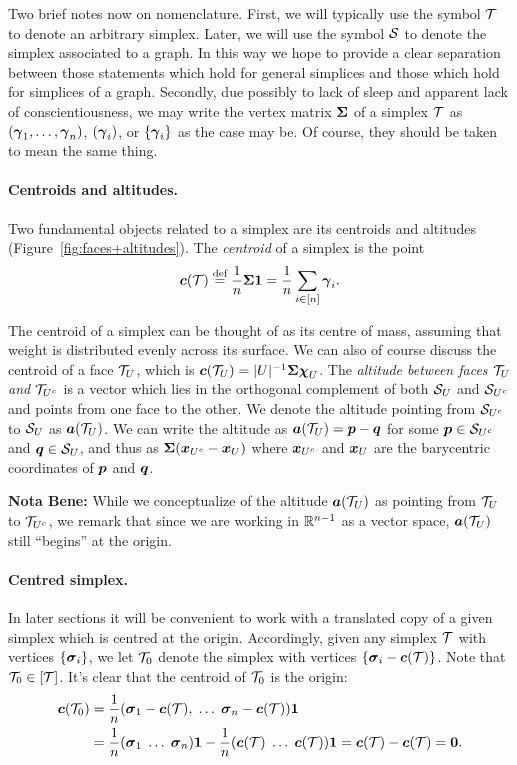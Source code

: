 Two brief notes now on nomenclature. First, we will typically  use the symbol $\mathcal{T}$ to denote an arbitrary simplex. Later, we will use the symbol $\mathcal{S}$  to denote  the simplex associated  to a  graph. In  this way we hope to provide a clear separation between those statements which hold for general simplices and those which hold for simplices of a graph. Secondly, due possibly  to lack of sleep and apparent lack  of conscientiousness, we may  write the vertex matrix  $\boldsymbol{\Sigma}$ of a simplex $\mathcal{T}$ as $(\vb*{\gamma}_1,\dots,\vb*{\gamma}_n)$, $(\vb*{\gamma}_i)$, or $\{\vb*{\gamma}_i\}$  as the case may be. Of course, they should be taken to mean  the  same  thing.  


\paragraph{Centroids and altitudes.}
Two fundamental objects related to a simplex are its centroids and altitudes (Figure~\ref{fig:faces+altitudes}). The \emph{centroid} of a simplex is the point 
\begin{equation}
\label{eq:centroid}
\vb*{c}(\mathcal{T}) \overset{\text{def}}{=} \frac{1}{n}\boldsymbol{\Sigma} \vb{1} = \frac{1}{n}\sum_{i\in[n]}\vb*{\gamma}_i.
\end{equation} 

The centroid of a simplex can be thought of as its centre of mass, assuming that weight is distributed evenly across its surface. 
We can also of course discuss  the  centroid of a face $\mathcal{T}_U$, which is $\vb*{c}(\mathcal{T}_U) = |U|^{-1}\boldsymbol{\Sigma}\boldsymbol{\chi}_U$. 
The \emph{altitude between faces $\mathcal{T}_U$ and $\mathcal{T}_{U^c}$} is a vector which lies in the orthogonal complement of both $\mathcal{S}_U$ and $\mathcal{S}_{U^c}$ and points from one face to the other. 
We denote the altitude pointing from $\mathcal{S}_{U^c}$ to $\mathcal{S}_{U}$ as $\vb*{a}(\mathcal{T}_U)$. We can write the altitude as $\vb*{a}(\mathcal{T}_U)=\vb*{p}-\vb*{q}$ for some $\vb*{p}\in \mathcal{S}_{U^c}$ and $\vb*{q}\in\mathcal{S}_{U}$, and thus as $\boldsymbol{\Sigma}(\vb*{x}_{U^c}-\vb*{x}_{U})$ where $\vb*{x}_{U^c}$ and $\vb*{x}_{U}$ are the barycentric coordinates of $\vb*{p}$ and $\vb*{q}$. 

\textbf{Nota Bene:} While  we conceptualize of the altitude $\vb*{a}(\mathcal{T}_U)$ as pointing from $\mathcal{T}_U$  to  $\mathcal{T}_{U^c}$, we  remark that since we are working in  $\mathbb{R}^{n-1}$  as  a vector  space,  $\vb*{a}(\mathcal{T}_U)$ still ``begins'' at  the origin. 


\paragraph{Centred  simplex.}
In later sections it will be convenient to work with a translated copy of a given simplex which is centred at the origin. Accordingly, given any simplex $\mathcal{T}$ with vertices $\{\vb*{\sigma}_i\}$, we let $\mathcal{T}_0$ denote the simplex with vertices $\{\vb*{\sigma}_i - \vb*{c}(\mathcal{T})\}$. Note that $\mathcal{T}_0\in[\mathcal{T}]$. It's clear that the centroid of $\mathcal{T}_0$ is the origin: 
\begin{align*}
\vb*{c}(\mathcal{T}_0) 
&= \frac{1}{n}(\vb*{\sigma}_1-\vb*{c}(\mathcal{T}),\;\dots\;\vb*{\sigma}_n-\vb*{c}(\mathcal{T}))\vb{1} \\
&= \frac{1}{n}(\vb*{\sigma}_1\;\dots\;\vb*{\sigma}_n)\vb{1} - \frac{1}{n}(\vb*{c}(\mathcal{T})\;\dots\;\vb*{c}(\mathcal{T}))\vb{1} = \vb*{c}(\mathcal{T}) - \vb*{c}(\mathcal{T})=\vb{0}.
\end{align*}

